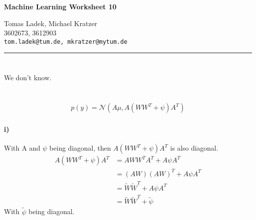 \documentclass[11pt]{article}
\makeatletter
\newcommand{\exercise}{\section{}}
\newcommand{\hwhead}[4]{
\begin{center}
\sffamily\large\bfseries Machine Learning Worksheet #1
\vspace{2mm}
\normalfont

#2\\
#3\\
\texttt{#4}
\end{center}
\vspace{6mm} \hrule \vspace{4mm}
}
\newcommand{\names}{Tomas Ladek, Michael Kratzer} %
\newcommand{\imats}{3602673, 3612903} %
\newcommand{\emails}{tom.ladek@tum.de, mkratzer@mytum.de} %
\makeatother
\begin{document}
\hwhead{10}{\names}{\imats}{\emails}


\exercise
We don't know.

\exercise
\begin{align*}
p(y) = \mathcal{N}(A\mu,A(WW^T+\psi)A^T)
\end{align*}
\paragraph{i)}
With A and $\psi$ being diagonal, then $A(WW^T+\psi)A^T$ is also diagonal.
\begin{align*}
	A(WW^T+\psi)A^T &= AWW^TA^T + A\psi A^T \\
	&= (AW)(AW)^T + A\psi A^T \\
	&= \widetilde{W}\widetilde{W}^T + A\psi A^T \\
	&= \widetilde{W}\widetilde{W}^T + \widetilde{\psi} 
\end{align*}
With $\widetilde{\psi}$ being diagonal.
\end{document}
